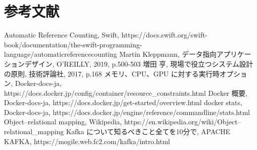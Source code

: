 \documentclass[../../main]{subfiles}
\begin{document}
    \section{参考文献}\label{sec:reference}

    \begin{thebibliography}{99}
         Automatic Reference Counting, Swift, https://docs.swift.org/swift-book/documentation/the-swift-programming-language/automaticreferencecounting
         Martin Kleppmann, データ指向アプリケーションデザイン, O'REILLY, 2019, p.500-503
         増田 亨, 現場で役立つシステム設計の原則, 技術評論社, 2017, p.168
         メモリ、CPU、GPU に対する実行時オプション, Docker-docs-ja, https://docs.docker.jp/config/container/resource\_constraints.html
         Docker 概要, Docker-docs-ja, https://docs.docker.jp/get-started/overview.html
         docker stats, Docker-docs-ja, https://docs.docker.jp/engine/reference/commandline/stats.html
         Object–relational mapping, Wikipedia, https://en.wikipedia.org/wiki/Object–relational\_mapping
         Kafka について知るべきこと全てを10分で, APACHE KAFKA, https://mogile.web.fc2.com/kafka/intro.html
    \end{thebibliography}

    \clearpage
\end{document}
